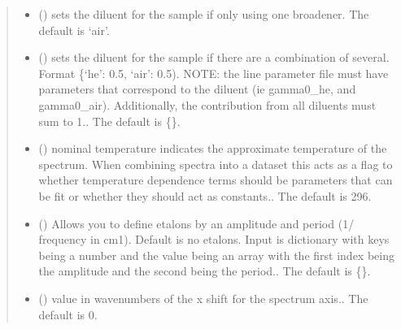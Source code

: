 \documentclass[letterpaper,10pt,english]{sphinxmanual}
\begin{document}
\begin{fulllineitems}
\begin{quote}
\begin{description}
\begin{itemize}
\item {} 
\sphinxAtStartPar
{} (\sphinxstyleliteralemphasis{\sphinxupquote{, }}) \textendash{} sets the diluent for the sample if only using one broadener. The default is ‘air’.

\item {} 
\sphinxAtStartPar
{} (\sphinxstyleliteralemphasis{\sphinxupquote{, }}) \textendash{} sets the diluent for the sample if there are a combination of several. Format \{‘he’: 0.5, ‘air’: 0.5). NOTE: the line parameter file must have parameters that correspond to the diluent (ie gamma0\_he, and gamma0\_air). Additionally, the contribution from all diluents must sum to 1.. The default is \{\}.

\item {} 
\sphinxAtStartPar
{} (\sphinxstyleliteralemphasis{\sphinxupquote{, }}) \textendash{} nominal temperature indicates the approximate temperature of the spectrum. When combining spectra into a dataset this acts as a flag to whether temperature dependence terms should be parameters that can be fit or whether they should act as constants.. The default is 296.

\item {} 
\sphinxAtStartPar
{} (\sphinxstyleliteralemphasis{\sphinxupquote{, }}) \textendash{} Allows you to define etalons by an amplitude and period (1/ frequency in cm\sphinxhyphen{}1). Default is no etalons. Input is dictionary with keys being a number and the value being an array with the first index being the amplitude and the second being the period.. The default is \{\}.

\item {} 
\sphinxAtStartPar
{} (\sphinxstyleliteralemphasis{\sphinxupquote{, }}) \textendash{} value in wavenumbers of the x shift for the spectrum axis.. The default is 0.


\end{itemize}
\end{description}
\end{quote}
\end{fulllineitems}
\end{document}
